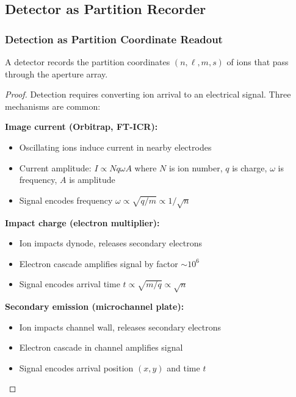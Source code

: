 \subsection{Detector as Partition Recorder}

\subsubsection{Detection as Partition Coordinate Readout}

\begin{theorem}
\label{thm:detector_recorder}
A detector records the partition coordinates $(n, \ell, m, s)$ of ions that pass through the aperture array.
\end{theorem}

\begin{proof}
Detection requires converting ion arrival to an electrical signal. Three mechanisms are common:

\textbf{Image current (Orbitrap, FT-ICR):}
\begin{itemize}
    \item Oscillating ions induce current in nearby electrodes
    \item Current amplitude: $I \propto Nq\omega A$ where $N$ is ion number, $q$ is charge, $\omega$ is frequency, $A$ is amplitude
    \item Signal encodes frequency $\omega \propto \sqrt{q/m} \propto 1/\sqrt{n}$
\end{itemize}

\textbf{Impact charge (electron multiplier):}
\begin{itemize}
    \item Ion impacts dynode, releases secondary electrons
    \item Electron cascade amplifies signal by factor $\sim 10^6$
    \item Signal encodes arrival time $t \propto \sqrt{m/q} \propto \sqrt{n}$
\end{itemize}

\textbf{Secondary emission (microchannel plate):}
\begin{itemize}
    \item Ion impacts channel wall, releases secondary electrons
    \item Electron cascade in channel amplifies signal
    \item Signal encodes arrival position $(x, y)$ and time $t$
\end{itemize}


\end{proof}
